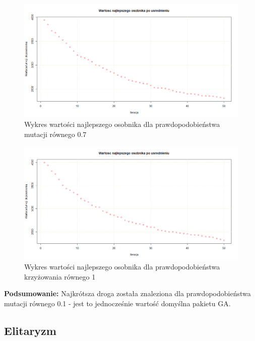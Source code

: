 \begin{figure}[H]
\centering

\includegraphics[scale=0.3]{IO_obrazy/bay29_mu_07}
\caption{Wykres wartości najlepszego osobnika dla prawdopodobieństwa mutacji równego 0.7}
\end{figure}


\begin{figure}[H]
\centering

\includegraphics[scale=0.3]{IO_obrazy/bay29_mu_1}
\caption{Wykres wartości najlepszego osobnika dla prawdopodobieństwa krzyżowania równego 1}
\end{figure}

\textbf{Podsumowanie:} Najkrótsza droga została znaleziona dla prawdopodobieństwa mutacji równego 0.1 - jest to jednocześnie wartość domyślna pakietu GA.


\newpage

\subsection{Elitaryzm}

